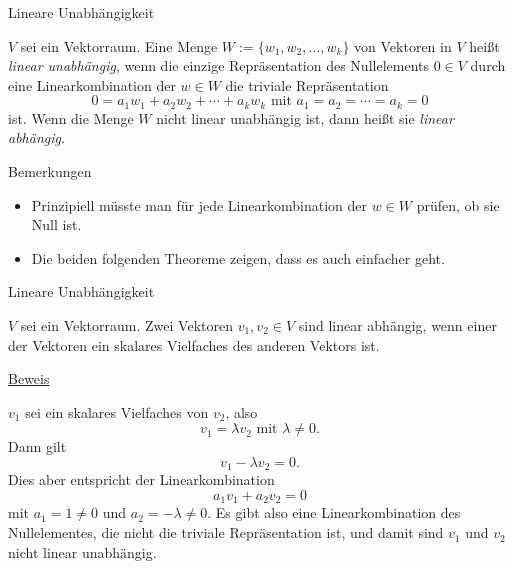 \documentclass[
  8pt,
  ignorenonframetext,
]{beamer}
\providecommand{\tightlist}{%
  \setlength{\itemsep}{0pt}\setlength{\parskip}{0pt}}
\begin{document}
\begin{frame}{Lineare Unabhängigkeit}
\protect\hypertarget{lineare-unabhuxe4ngigkeit-1}{}
\small
\begin{definition}
\justifying
$V$ sei ein Vektorraum. Eine Menge $W := \{w_1, w_2, ...,w_k\}$ von Vektoren in $V$ heißt
\textit{linear unabhängig}, wenn die einzige Repräsentation des Nullelements
$0 \in V$ durch eine Linearkombination der $w \in W$ die triviale
Repräsentation
\begin{equation}
0 = a_1 w_1 + a_2 w_2 + \cdots + a_k w_k \mbox{ mit } a_1 = a_2 =  \cdots = a_k = 0
\end{equation}
ist. Wenn die Menge $W$ nicht linear unabhängig ist, dann heißt sie \textit{linear abhängig}.
\end{definition}

Bemerkungen

\begin{itemize}
\tightlist
\item
  Prinzipiell müsste man für jede Linearkombination der \(w \in W\)
  prüfen, ob sie Null ist.
\item
  Die beiden folgenden Theoreme zeigen, dass es auch einfacher geht.
\end{itemize}
\end{frame}

\begin{frame}{Lineare Unabhängigkeit}
\protect\hypertarget{lineare-unabhuxe4ngigkeit-2}{}
\small
\begin{theorem}
\justifying
\normalfont
$V$ sei ein Vektorraum. Zwei Vektoren $v_1, v_2 \in V$ sind linear abhängig,
wenn einer der Vektoren ein skalares Vielfaches des anderen Vektors ist.
\end{theorem}
\footnotesize

\underline{Beweis} \vspace{1mm}

\(v_1\) sei ein skalares Vielfaches von \(v_2\), also \begin{equation}
v_1 = \lambda v_2 \mbox{ mit } \lambda \neq 0.
\end{equation} Dann gilt \begin{equation}
v_1 - \lambda v_2 = 0.
\end{equation} Dies aber entspricht der Linearkombination
\begin{equation}
a_1v_1 + a_2v_2 = 0
\end{equation} mit \(a_1 = 1 \neq 0\) und \(a_2 = -\lambda \neq 0\). Es
gibt also eine Linearkombination des Nullelementes, die nicht die
triviale Repräsentation ist, und damit sind \(v_1\) und \(v_2\) nicht
linear unabhängig.
\end{frame}
\end{document}
